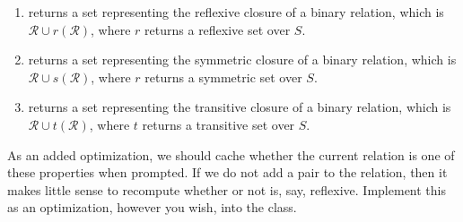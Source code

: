 \begin{enumerate}[label=(\alph*)]
    \item {} returns a set representing the reflexive closure of a binary relation, which is $\mathcal{R} \cup r(\mathcal{R})$, where $r$ returns a reflexive set over $S$.
    
    \item {} returns a set representing the symmetric closure of a binary relation, which is $\mathcal{R} \cup s(\mathcal{R})$, where $r$ returns a symmetric set over $S$.

    \item {} returns a set representing the transitive closure of a binary relation, which is $\mathcal{R} \cup t(\mathcal{R})$, where $t$ returns a transitive set over $S$.
\end{enumerate}

As an added optimization, we should cache whether the current relation is one of these properties when prompted. If we do not add a pair to the relation, then it makes little sense to recompute whether or not is, say, reflexive. Implement this as an optimization, however you wish, into the class.

